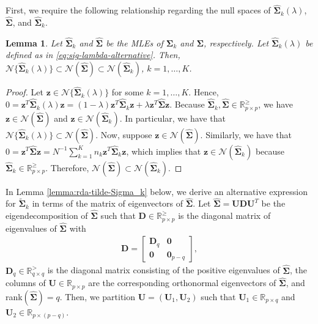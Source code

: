 \documentclass[]{interact}\usepackage[]{graphicx}\usepackage[]{color}
\newtheorem{lemma}{Lemma}
\begin{document}
First, we require the following relationship regarding the null spaces of
$\widehat{\bm \Sigma}_k(\lambda)$, $\widehat{\bm \Sigma}$, and $\widehat{ \bm
  \Sigma}_k$.

\begin{lemma}\label{lemma:null-spaces}
Let $\widehat{\bm \Sigma}_k$ and $\widehat{\bm \Sigma}$ be the MLEs of $\bm
\Sigma_k$ and $\bm \Sigma$, respectively. Let $\widehat{\bm \Sigma}_k(\lambda)$
be defined as in \eqref{eq:sig-lambda-alternative}. Then,
$\mathcal{N}\{\widehat{\bm \Sigma}_k(\lambda)\} \subset \mathcal{N}(\widehat{
  \bm \Sigma}) \subset \mathcal{N}(\widehat{\bm \Sigma}_k)$, $k = 1, \ldots, K$.
\end{lemma}
\begin{proof}
Let $\bm z \in \mathcal{N}\{\widehat{\bm \Sigma}_k(\lambda)\}$ for some $k = 1,
\ldots, K$. Hence, $0 = \bm z^{T} \widehat{\bm \Sigma}_k(\lambda) \bm z = (1 -
\lambda) \bm z^{T} \widehat{\bm \Sigma}_k \bm z + \lambda \bm z^{T} \widehat{
  \bm \Sigma} \bm z$. Because $\widehat{\bm \Sigma}_k, \widehat{\bm \Sigma}\in
\mathbb{R}_{p \times p}^{\ge}$, we have $\bm z \in \mathcal{N}(\widehat{
  \bm \Sigma})$ and $\bm z \in \mathcal{N}(\widehat{\bm \Sigma}_k)$. In particular,
we have that $\mathcal{N}\{\widehat{\bm \Sigma}_k(\lambda)\} \subset
\mathcal{N}(\widehat{\bm \Sigma})$. Now, suppose $\bm z \in
\mathcal{N}(\widehat{\bm \Sigma})$. Similarly, we have that $0 = \bm z^{T}
\widehat{\bm \Sigma} \bm z = N^{-1} \sum_{k = 1}^K n_k \bm z^{T} \widehat{
  \bm \Sigma}_k \bm z$, which implies that $\bm z \in \mathcal{N}(\widehat{
  \bm \Sigma}_k)$ because $\widehat{\bm \Sigma}_k \in \mathbb{R}_{p \times
  p}^{\ge}$. Therefore, $\mathcal{N}(\widehat{\bm \Sigma}) \subset
\mathcal{N}(\widehat{\bm \Sigma}_k)$.
\end{proof}

In Lemma \ref{lemma:rda-tilde-Sigma_k} below, we derive an alternative
expression for $\tilde{\bm \Sigma}_k$ in terms of the matrix of eigenvectors of
$\widehat{\bm \Sigma}$. Let $\widehat{\bm \Sigma} = \bm U \bm D \bm U^{T}$ be
the eigendecomposition of $\widehat{\bm \Sigma}$ such that $\bm D \in
\mathbb{R}_{p \times p}^{\ge}$ is the diagonal matrix of eigenvalues of
$\widehat{\bm \Sigma}$ with
\begin{align*}
  \bm D = \begin{bmatrix}
    \bm D_q & \bm 0 \\
    \bm{0} & \bm 0_{p-q}
    \end{bmatrix},
\end{align*}
$\bm D_q \in \mathbb{R}_{q \times q}^{>}$ is the diagonal matrix consisting of
the positive eigenvalues of $\widehat{\bm \Sigma}$, the columns of $\bm U \in
\mathbb{R}_{p \times p}$ are the corresponding orthonormal eigenvectors of
$\widehat{\bm \Sigma}$, and rank$(\widehat{\bm \Sigma}) = q$. Then, we partition
$\bm U = (\bm U_1, \bm U_2)$ such that $\bm U_1 \in \mathbb{R}_{p \times q}$ and
$\bm U_2 \in \mathbb{R}_{p \times (p - q)}$.
\end{document}
